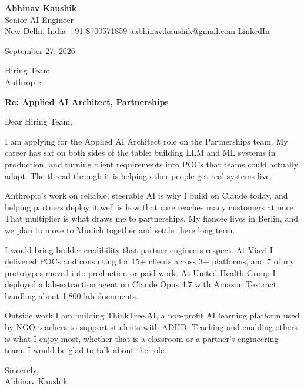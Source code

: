\documentclass[11pt,a4paper]{article}
\begin{document}
{\Large\bfseries Abhinav Kaushik}\\
Senior AI Engineer\\
New Delhi, India \textbar{} +91 8700571859 \textbar{} \href{mailto:aabhinav.kaushik@gmail.com}{aabhinav.kaushik@gmail.com} \textbar{} \href{https://www.linkedin.com/in/abhinav-kaushik10/}{LinkedIn}  

September 27, 2026

Hiring Team\\
Anthropic

\textbf{Re: Applied AI Architect, Partnerships}

Dear Hiring Team,

I am applying for the Applied AI Architect role on the Partnerships team. My career has sat on both sides of the table: building LLM and ML systems in production, and turning client requirements into POCs that teams could actually adopt. The thread through it is helping other people get real systems live.

Anthropic's work on reliable, steerable AI is why I build on Claude today, and helping partners deploy it well is how that care reaches many customers at once. That multiplier is what draws me to partnerships. My fiancée lives in Berlin, and we plan to move to Munich together and settle there long term.

I would bring builder credibility that partner engineers respect. At Viavi I delivered POCs and consulting for 15+ clients across 3+ platforms, and 7 of my prototypes moved into production or paid work. At United Health Group I deployed a lab-extraction agent on Claude Opus 4.7 with Amazon Textract, handling about 1,800 lab documents.

Outside work I am building ThinkTree.AI, a non-profit AI learning platform used by NGO teachers to support students with ADHD. Teaching and enabling others is what I enjoy most, whether that is a classroom or a partner's engineering team. I would be glad to talk about the role.

Sincerely,\\[4pt]
Abhinav Kaushik
\end{document}
